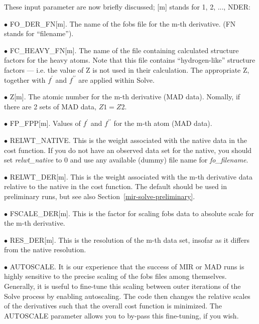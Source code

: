 \documentclass{report}
\begin{document}
These input parameter are now briefly discussed; [m] stands for 1, 2, ..., 
NDER:

$\bullet$ FO\_DER\_FN[m].  
The name of the fobs file for the m-th derivative.
(FN stands for ``filename'').

$\bullet$ FC\_HEAVY\_FN[m].
The name of the file containing calculated 
structure factors for the heavy atoms.  Note that this file contains 
``hydrogen-like'' structure factors --- i.e. the value of Z is not used
in their calculation.  The appropriate Z, together with $f^\prime$ and 
$f^{\prime\prime}$ are applied within Solve.

$\bullet$ Z[m].  The atomic number for the m-th 
derivative (MAD data).  Nomally, if there are 2 sets of MAD data, $Z1 = Z2$.

$\bullet$ FP\_FPP[m].  
Values of  $f^\prime$ and $f^{\prime\prime}$ for the m-th atom (MAD data).

$\bullet$ RELWT\_NATIVE.
 This is the weight associated with the native data
in the cost function.  If you do not have an observed data set for the native, 
you should set {\it relwt\_native} to 0 and use any available (dummy) file name for 
{\it fo\_filename}.

$\bullet$ RELWT\_DER[m].
 This is the weight associated with
the m-th derivative data relative to the native in the cost function.  
The default should be used in preliminary runs, but
see also Section~\ref{mir-solve-preliminary}.

$\bullet$ FSCALE\_DER[m]. 
This is the factor for scaling fobs data to 
absolute scale for the m-th derivative.  

$\bullet$ RES\_DER[m].
 This is the resolution of the m-th data set, insofar as it differs
from the native resolution.

$\bullet$ AUTOSCALE.
It is our experience that the success of MIR or MAD runs is highly
sensitive to the precise scaling of the fobs files among themselves.  
Generally, it is useful to fine-tune this scaling between outer iterations 
of the Solve process by enabling autoscaling.  The code then changes the
relative scales of the derivatives such that the overall
cost function is minimized.  The
AUTOSCALE parameter allows you to by-pass this fine-tuning, if you wish.
\end{document}
